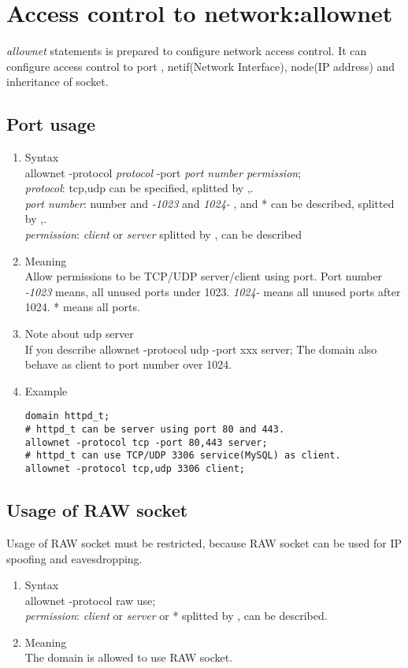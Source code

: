 \documentclass{article}
\begin{document}
\begin{enumerate}
\end{enumerate}



\section{Access control to network:allownet}
{\it allownet} statements is prepared to configure network access control.
It can configure access control to  port , netif(Network
Interface), node(IP address) and inheritance of socket.

\subsection{Port usage}
\begin{enumerate}
 \item Syntax\\
 allownet -protocol {\it protocol} -port {\it port number} {\it permission};\\
 {\it protocol}: tcp,udp can be specified, splitted by ,.\\
 {\it port number}: number and {\it -1023} and {\it 1024-} , and * can
       be described, splitted by ,.\\
 {\it permission}: {\it client} or {\it server} splitted by , can be
       described
 \item Meaning\\
       Allow permissions to be TCP/UDP server/client using port. Port number {\it
       -1023} means, all unused ports under 1023. {\it 1024-} means all
       unused ports after 1024. * means all ports. 
 \item Note about udp server\\
       If you describe allownet -protocol udp -port xxx server;
       The domain also behave as client to port number over 1024.
 \item Example
\begin{verbatim}
domain httpd_t;
# httpd_t can be server using port 80 and 443.
allownet -protocol tcp -port 80,443 server;
# httpd_t can use TCP/UDP 3306 service(MySQL) as client.
allownet -protocol tcp,udp 3306 client;
\end{verbatim}
\end{enumerate}

\subsection{Usage of RAW socket}
Usage of RAW socket must be restricted, because RAW socket can be used
for IP spoofing and eavesdropping.
\begin{enumerate}
 \item Syntax\\
       allownet -protocol raw use;\\
        {\it permission}: {\it client} or {\it server} or * splitted by , can be
       described.
 \item Meaning\\
       The domain is allowed to use RAW socket.
\end{enumerate}
\end{document}
